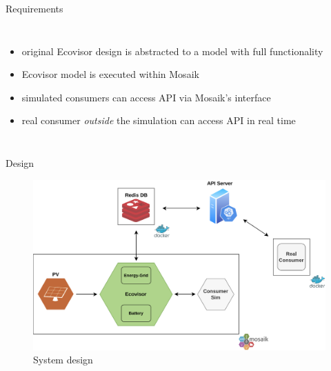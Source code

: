 \begin{frame}{Requirements}
    \begin{columns}
        \begin{itemize}
            \item original Ecovisor design is abstracted to a model with
                full functionality
            \item Ecovisor model is executed within Mosaik
            \item simulated consumers can access API via Mosaik's interface
            \item real consumer \emph{outside} the simulation can access API
                in real time
        \end{itemize}
    \end{columns}
\end{frame}

\begin{frame}{Design}
    \begin{figure}
    \centering
    \includegraphics[height=.68\textheight]{../../system_design}
    \caption{System design}
    \label{fig:system_design}
    \end{figure}
\end{frame}
